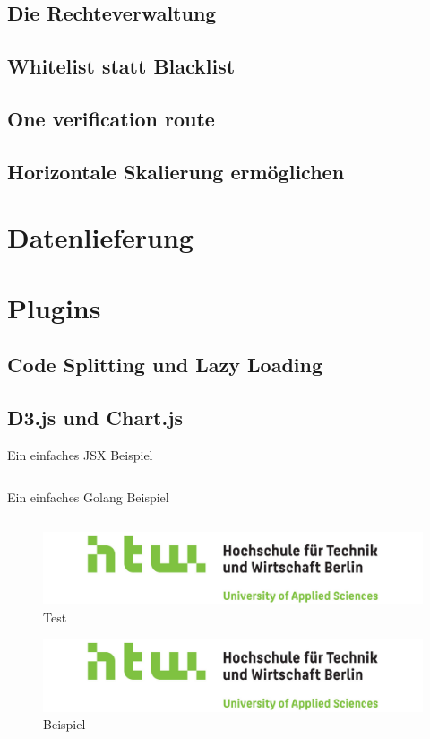 \subsection{Die Rechteverwaltung}
\subsection{Whitelist statt Blacklist}
\subsection{One verification route}
\subsection{Horizontale Skalierung ermöglichen}


\section{Datenlieferung}

\section{Plugins}
\subsection{Code Splitting und Lazy Loading}
\subsection{D3.js und Chart.js}
\begin{listing}
    \label{lst:HelloJSX}
    \caption{Ein einfaches JSX Beispiel}
    \inputminted{jsx}{snippets/examples/Welcome.jsx}
\end{listing}

\begin{listing}
    \label{lst:Golang}
    \caption{Ein einfaches Golang Beispiel}
    \inputminted{go}{snippets/examples/hello.go}
\end{listing}

\newpage

\begin{figure}
    \label{figure:test}
    \includegraphics[scale=0.2]{img/HTW}
    \caption{Test}
\end{figure}

\begin{figure}
    \label{figure:beispiel}
    \includegraphics[scale=0.2]{img/HTW}
    \caption{Beispiel}
\end{figure}
